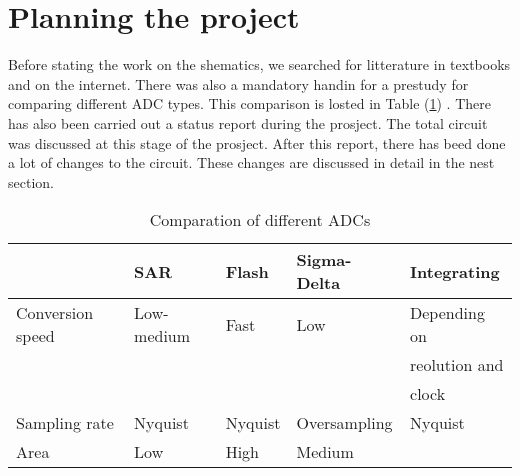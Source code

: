 \documentclass[english, 12pt, a4paper]{article}
\begin{document}
\section{Planning the project} 
Before stating the work on the shematics, we searched for litterature in textbooks and on the internet. There was also a mandatory handin for a prestudy for comparing different ADC types. This 
comparison is losted in Table (\ref{comp:adc}) \cite{forstudie}. There has also been carried out a status report during the prosject. The total circuit was discussed at this stage of the prosject.
After this report, there has beed done a lot of changes to the circuit. These changes are discussed in detail in the nest section. 

\begin{table}[!ht]
 \centering
 \begin{tabular}{|l|l|l|l|l|}
  \hline
                   & SAR        & Flash   & Sigma-Delta  & Integrating          \\ \hline
  Conversion speed & Low-medium & Fast    & Low          & Depending on 	\\
		   &	        &	  &		 & reolution and 	\\
		   &		&	  &		 & clock 		\\ \hline
  Sampling rate    & Nyquist    & Nyquist & Oversampling & Nyquist              \\ \hline
  Area             & Low        & High    & Medium       &                      \\ \hline
 \end{tabular}
 \caption{Comparation of different ADCs}
 \label{comp:adc}
\end{table}

\newpage
\end{document}
